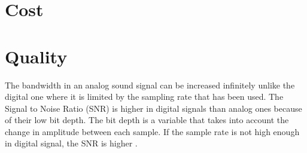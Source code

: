 \section{Cost}


\section{Quality}

The bandwidth in an analog sound signal can be increased infinitely unlike the digital one where it is limited by the sampling rate that has been used. 
The Signal to Noise Ratio (SNR) is higher in digital signals than analog ones because of their low bit depth. The bit depth is a variable that takes into account the change in amplitude between each sample. If the sample rate is not high enough in digital signal, the SNR is higher \citep{analog_quality}. 

